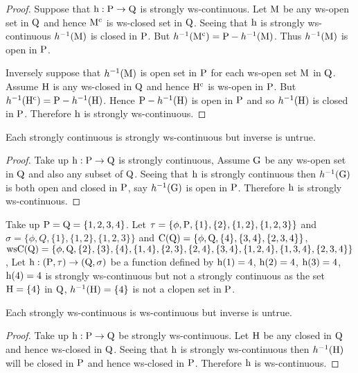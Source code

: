 \begin{proof}
Suppose that $\mathrm{h}: \mathrm{P}\to \mathrm{Q}$ is strongly ws-continuous. Let $\mathrm{M}$ be any ws-open set in $\mathrm{Q}$ and hence $\mathrm{M}^{\text{c}}$ is ws-closed set in $\mathrm{Q}$. Seeing that $\mathrm{h}$ is strongly ws-continuous $h^{-1}(\mathrm{M})$ is closed in $\mathrm{P}$. But $h^{-1} (\mathrm{M}^{\text{c}}) =\mathrm{P} - h^{-1} (\mathrm{M})$. Thus $h^{-1}(\mathrm{M})$ is open in $\mathrm{P}$.

Inversely suppose that $h^{-1}(\mathrm{M})$ is open set in $\mathrm{P}$ for each ws-open set $\mathrm{M}$ in $\mathrm{Q}$. Assume $\mathrm{H}$ is any ws-closed in $\mathrm{Q}$ and hence $\mathrm{H}^{\text{c}}$ is ws-open in $\mathrm{P}$. But $h^{-1}(\mathrm{H}^{\text{c}}) =\mathrm{P} -h^{-1} (\mathrm{H})$. Hence $\mathrm{P}-h^{-1} (\mathrm{H})$ is open in $\mathrm{P}$ and so $h^{-1}(\mathrm{H})$ is closed in $\mathrm{P}$. Therefore $\mathrm{h}$ is strongly ws-continuous.
\end{proof}

\begin{thm}\label{thm3.3.15}
Each strongly continuous is strongly ws-continuous but inverse is untrue.
\end{thm}

\begin{proof}
Take up $\mathrm{h}: \mathrm{P}\to \mathrm{Q}$ is strongly continuous, Assume $\mathrm{G}$ be any ws-open set in $\mathrm{Q}$ and also any subset of $\mathrm{Q}$. Seeing that $\mathrm{h}$ is strongly continuous then $h^{-1}(\mathrm{G})$ is both open and closed in $\mathrm{P}$, say $h^{-1}(\mathrm{G})$ is open in $\mathrm{P}$. Therefore $\mathrm{h}$ is strongly ws-continuous.
\end{proof}

\begin{exm}\label{exam3.3.16}
Take up $\mathrm{P}=\mathrm{Q}= \{1, 2, 3, 4\}$. Let $\tau = \{\phi, \TSP, \{1\}, \{2\}, \{1, 2\},\break \{1,2,3\}\}$ and $\sigma =\{\phi, Q, \{1\}, \{1,2\}, \{1,2,3\}\}$ and $\mathrm{C}(\mathrm{Q})= \{\phi, \mathrm{Q},\{4\},\{3,4\},\{2,3,4\}\}$, $\mathrm{ws}\mathrm{C}(\mathrm{Q})= \{\phi,\mathrm{Q},\{2\},\{3\}, \{4\},\{1,4\},\{2,3\},\{2,4\}, \{3,4\}, \{1,2,4\},\{1,3,4\},\{2,3,4\}\}$, Let $\mathrm{h}: (\mathrm{P}, \tau)\to (\mathrm{Q}, \sigma)$ be a function defined by $\mathrm{h}(1)=4$, $\mathrm{h}(2)=4$, $\mathrm{h}(3)=4$, $\mathrm{h}(4)=4$ is strongly ws-continuous but not a strongly continuous as the set $\mathrm{H}=\{4\}$ in $\mathrm{Q}$, $h^{-1}(\mathrm{H})=\{4\}$ is not a clopen set in $\mathrm{P}$.
\end{exm}

\begin{thm}\label{thm3.3.17}
Each strongly ws-continuous is ws-continuous but inverse is untrue.
\end{thm}

\begin{proof}
Take up $\mathrm{h}: \mathrm{P}\to \mathrm{Q}$ be strongly ws-continuous. Let $\mathrm{H}$ be any closed in $\mathrm{Q}$ and hence ws-closed in $\mathrm{Q}$. Seeing that $\mathrm{h}$ is strongly ws-continuous then $h^{-1}(\mathrm{H})$ will be closed in $\mathrm{P}$ and hence ws-closed in $\mathrm{P}$. Therefore $\mathrm{h}$ is ws-continuous.
\end{proof}

